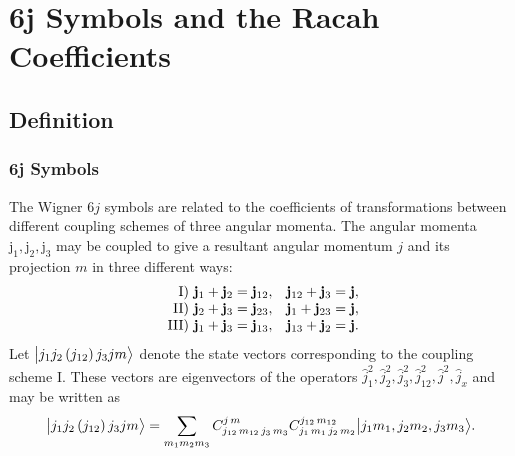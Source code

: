 \chapter{6j Symbols and the Racah Coefficients}\label{chap:9}

\section{Definition}\label{sec:9.1}
\subsection{6j Symbols}\label{sec:9.1.1}
The Wigner $6 j$ symbols \cite{ref110} are related to the coefficients of transformations between different coupling schemes of three angular momenta. The angular momenta $\mathrm{j}_{1}, \mathrm{j}_{2}, \mathrm{j}_{3}$ may be coupled to give a resultant angular momentum $j$ and its projection $m$ in three different ways:
\begin{equation}
\begin{array}{rlrl}
\text { I) } \mathbf{j}_{1}+\mathbf{j}_{2}  =\mathbf{j}_{12}, & \mathbf{j}_{12}+\mathbf{j}_{3}=\mathbf{j}, \\
\text { II) } \mathbf{j}_{2}+\mathbf{j}_{3}=\mathbf{j}_{23}, & \mathbf{j}_{1}+\mathbf{j}_{23}=\mathbf{j}, \\
\text { III) } \mathbf{j}_{1}+\mathbf{j}_{3}=\mathbf{j}_{13}, & \mathbf{j}_{13}+\mathbf{j}_{2}=\mathbf{j} . \label{eq:9:1:1}
\end{array}
\end{equation}
Let $\bigl| j_{1} j_{2}\left(j_{12}\right) j_{3} j m \bigr\rangle$ denote the state vectors corresponding to the coupling scheme I. These vectors are eigenvectors of the operators $\widehat{j}_{1}^{2}, \widehat{j}_{2}^{2}, \hat{j}_{3}^{2}, \hat{j}_{12}^{2}, \hat{j}^{2}, \hat{j}_{x}$ and may be written as
\begin{equation}
\bigl| j_{1} j_{2}\left(j_{12}\right) j_{3} j m \bigr\rangle=\sum_{m_{1} m_{2} m_{3}} C_{j_{12}\,m_{12}\,j_{3}\,m_{3}}^{j\,m} C_{j_{1}\,m_{1}\,j_{2}\,m_{2}}^{j_{12}\,m_{12}}\bigl| j_{1} m_{1}, j_{2} m_{2}, j_{3} m_{3} \bigr\rangle . \label{eq:9:1:2}
\end{equation}
